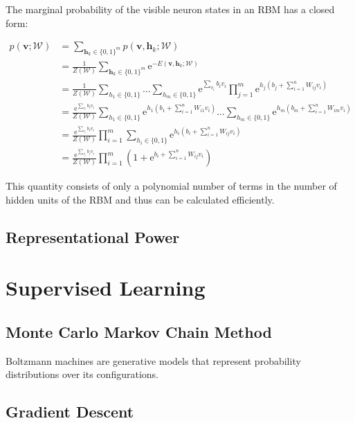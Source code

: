The marginal probability of the visible neuron states in an RBM has a closed form:

\begin{align}
   p(\bm{v};\mathcal{W}) &= \sum_{\bm{h}_k \in \{0,1\}^m} p(\bm{v},\bm{h}_k;\mathcal{W})\\
   &= \frac{1}{Z(\mathcal{W})}\sum_{\bm{h}_k \in \{0,1\}^m} \mathrm{e}^{-E(\bm{v}, \bm{h}_k;\mathcal{W})}\\
   &= \frac{1}{Z(\mathcal{W})}\sum_{h_1\in \{0,1\}}\dots\sum_{h_m \in \{0,1\}}\mathrm{e}^{\sum_{v_i}b_iv_i}\prod_{j=1}^m\mathrm{e}^{h_j(b_j + \sum_{i=1}^nW_{ij}v_i)}\\
   &= \frac{\mathrm{e}^{\sum_{v_i}b_iv_i}}{Z(\mathcal{W})}\sum_{h_1 \in \{0,1\}}\mathrm{e}^{h_1(b_1 + \sum_{i=1}^nW_{i1}v_i)}\dots\sum_{h_m \in \{0,1\}}\mathrm{e}^{h_m(b_m + \sum_{i=1}^nW_{im}v_i)}\\
   &= \frac{\mathrm{e}^{\sum_{v_i}b_iv_i}}{Z(\mathcal{W})}\prod_{i=1}^m\sum_{h_i \in \{0,1\}}\mathrm{e}^{h_i(b_i + \sum_{i=1}^nW_{ij}v_i)}\\
   &= \frac{\mathrm{e}^{\sum_{v_i}b_iv_i}}{Z(\mathcal{W})}\prod_{i=1}^m(1+\mathrm{e}^{b_i + \sum_{i=1}^nW_{ij}v_i})
\end{align}

This quantity consists of only a polynomial number of terms in the number of hidden units of the RBM and 
thus can be calculated efficiently.

\subsection{Representational Power}
\section{Supervised Learning}
\subsection{Monte Carlo Markov Chain Method}
\label{sec:mcmc}
Boltzmann machines are generative models that represent probability distributions over its configurations.

\subsection{Gradient Descent}
